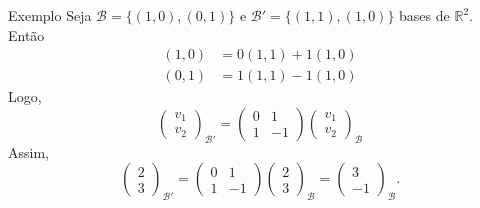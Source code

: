 \documentclass{beamer}
\begin{document}
\begin{darkframes}
\begin{frame}{Exemplo}
  Seja ${\mathcal{B}} = \{(1,0),(0,1)\}$ e ${\mathcal{B}}' = \{(1,1), (1,0)\}$ bases de ${\mathbb{R}}^2$. Então 
  \begin{align*}
    (1,0) &= 0(1,1)+1(1,0)\\
    (0,1) &= 1(1,1)-1(1,0)
  \end{align*}
  Logo,
  \begin{equation*}
    \begin{pmatrix}
      v_1\\v_2
    \end{pmatrix}_{{\mathcal{B}}'} = 
    \begin{pmatrix}
      0 & 1\\
      1 & -1
    \end{pmatrix}
    \begin{pmatrix}
      v_1\\v_2
    \end{pmatrix}_{{\mathcal{B}}}
  \end{equation*}
  Assim, 
  \begin{equation*}
     \begin{pmatrix}
        2\\3
     \end{pmatrix}_{{\mathcal{B}}'} =
     \begin{pmatrix}
        0 & 1\\ 1 & -1
     \end{pmatrix} 
     \begin{pmatrix}
        2\\3
     \end{pmatrix}_{\mathcal{B}} = 
     \begin{pmatrix}
        3\\-1
     \end{pmatrix}_{\mathcal{B}}.
  \end{equation*}
\end{frame}


\end{darkframes}
\end{document}
